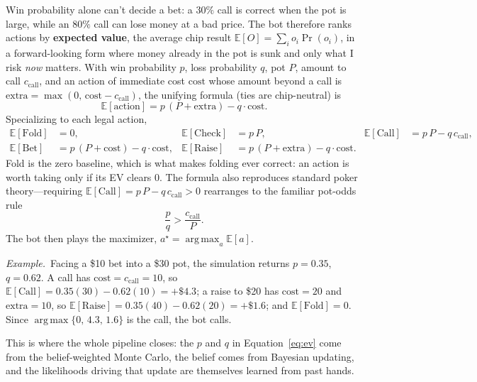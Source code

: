 \documentclass[11pt]{article}
\DeclareMathOperator*{\argmax}{arg\,max}
\newcommand{\example}[1]{\smallskip\noindent\textit{Example.}\ #1\smallskip}
\begin{document}
Win probability alone can't decide a bet: a $30\%$ call is correct when the pot is
large, while an $80\%$ call can lose money at a bad price. The bot therefore ranks
actions by \textbf{expected value}, the average chip result $\mathbb{E}[O]=\sum_i
o_i\Pr(o_i)$, in a forward-looking form where money already in the pot is sunk and
only what I risk \emph{now} matters. With win probability $p$, loss probability
$q$, pot $P$, amount to call $c_{\text{call}}$, and an action of immediate cost
$\mathrm{cost}$ whose amount beyond a call is $\mathrm{extra}=\max(0,\,
\mathrm{cost}-c_{\text{call}})$, the unifying formula (ties are chip-neutral) is
\begin{equation}
\mathbb{E}[\text{action}]=p\,(P+\mathrm{extra})-q\cdot\mathrm{cost}.
\label{eq:ev}
\end{equation}
Specializing to each legal action,
\begin{align}
\mathbb{E}[\text{Fold}]&=0, &
\mathbb{E}[\text{Check}]&=p\,P, &
\mathbb{E}[\text{Call}]&=p\,P-q\,c_{\text{call}},\\
\mathbb{E}[\text{Bet}]&=p\,(P+\mathrm{cost})-q\cdot\mathrm{cost}, &
\mathbb{E}[\text{Raise}]&=p\,(P+\mathrm{extra})-q\cdot\mathrm{cost}. &&
\end{align}
Fold is the zero baseline, which is what makes folding ever correct: an action is
worth taking only if its EV clears $0$. The formula also reproduces standard
poker theory---requiring $\mathbb{E}[\text{Call}]=p\,P-q\,c_{\text{call}}>0$
rearranges to the familiar pot-odds rule
\begin{equation}
\frac{p}{q}>\frac{c_{\text{call}}}{P}.
\end{equation}
The bot then plays the maximizer, $a^\star=\argmax_a \mathbb{E}[a]$.

\example{Facing a \$10 bet into a \$30 pot, the simulation returns $p=0.35$,
$q=0.62$. A call has $\mathrm{cost}=c_{\text{call}}=10$, so
$\mathbb{E}[\text{Call}]=0.35(30)-0.62(10)=+\$4.3$; a raise to \$20 has
$\mathrm{cost}=20$ and $\mathrm{extra}=10$, so
$\mathbb{E}[\text{Raise}]=0.35(40)-0.62(20)=+\$1.6$; and
$\mathbb{E}[\text{Fold}]=0$. Since $\argmax\{0,\,4.3,\,1.6\}$ is the call, the bot
calls.}

This is where the whole pipeline closes: the $p$ and $q$ in Equation~\eqref{eq:ev}
come from the belief-weighted Monte Carlo, the belief comes from Bayesian updating,
and the likelihoods driving that update are themselves learned from past hands.

\end{document}
